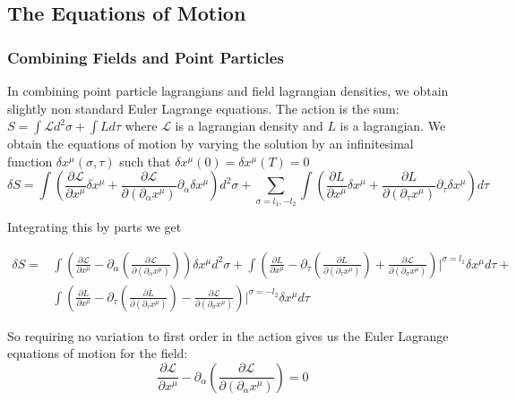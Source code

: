 \documentclass[11pt,a4paper]{article}
\begin{document}
\FloatBarrier
\subsection{The Equations of Motion}
\label{sec:eom}

\FloatBarrier
\subsubsection{Combining Fields and Point Particles}

In combining point particle lagrangians and field lagrangian densities, we obtain slightly non standard Euler Lagrange equations. The action is the sum: $S=\int\mathcal{L}d^{2}\sigma+\int Ld\tau$ where $\mathcal{L}$ is a lagrangian density and $L$ is a lagrangian. We obtain the equations of motion by varying the solution by an infinitesimal function $\delta x^{\mu}(\sigma,\tau)$ such that $\delta x^{\mu}(0)=\delta x^{\mu}(T)=0$
\begin{equation*}
\delta S=\int\left(\frac{\partial\mathcal{L}}{\partial x^{\mu}}\delta x^{\mu}+\frac{\partial\mathcal{L}}{\partial(\partial_{\alpha}x^{\mu})}\partial_{\alpha}\delta x^{\mu}\right)d^{2}\sigma+\sum_{\sigma=l_1,-l_2} \int\left(\frac{\partial L}{\partial x^{\mu}}\delta x^{\mu}+\frac{\partial L}{\partial(\partial_{\tau}x^{\mu})}\partial_{\tau}\delta x^{\mu}\right)d\tau
\end{equation*}

Integrating this by parts we get

\begin{align*}
\delta S=&\int\left(\frac{\partial\mathcal{L}}{\partial x^{\mu}}-\partial_{\alpha}\left(\frac{\partial\mathcal{L}}{\partial(\partial_{\alpha}x^{\mu})}\right)\right)\delta x^{\mu}d^{2}\sigma+
\int\left(\frac{\partial L}{\partial x^{\mu}}-\partial_{\tau}\left(\frac{\partial L}{\partial(\partial_{\tau}x^{\mu})}\right)+\frac{\partial\mathcal{L}}{\partial(\partial_{\sigma}x^{\mu})}\right)|^{\sigma=l_{1}}\delta x^{\mu}d\tau+\\
&\int\left(\frac{\partial L}{\partial x^{\mu}}-\partial_{\tau}\left(\frac{\partial L}{\partial(\partial_{\tau}x^{\mu})}\right)-\frac{\partial\mathcal{L}}{\partial(\partial_{\sigma}x^{\mu})}\right)|^{\sigma=-l_{2}}\delta x^{\mu}d\tau
\end{align*} 

So requiring no variation to first order in the action gives us the Euler Lagrange equations of motion for the field:
\begin{equation}
\label{eq:eulerfield}
\frac{\partial\mathcal{L}}{\partial x^{\mu}}-\partial_{\alpha}\left(\frac{\partial\mathcal{L}}{\partial(\partial_{\alpha}x^{\mu})}\right)=0
\end{equation}
\end{document}
